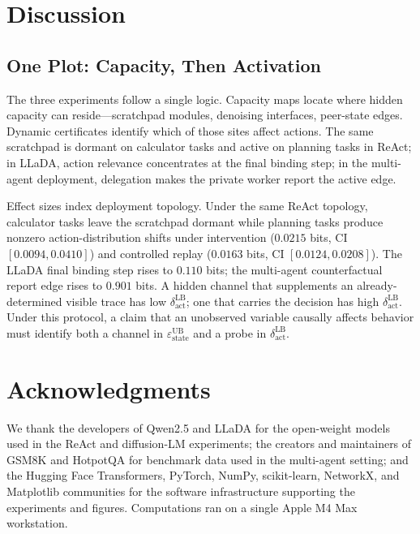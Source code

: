 \documentclass{article}
\begin{document}
  \section{Discussion}
  \label{sec:discussion}

  \subsection{One Plot: Capacity, Then Activation}

  The three experiments follow a single logic. Capacity maps locate where hidden
  capacity can reside---scratchpad modules, denoising interfaces, peer-state
  edges. Dynamic certificates identify which of those sites affect actions. The
  same scratchpad is dormant on calculator tasks and active on
  planning tasks in ReAct; in LLaDA, action relevance concentrates at the final
  binding step; in the multi-agent deployment, delegation makes the private
  worker report the active edge.

  Effect sizes index deployment topology. Under the same ReAct topology,
  calculator tasks leave the scratchpad dormant while planning tasks produce
  nonzero action-distribution shifts under intervention ($0.0215$ bits, CI
  $[0.0094,0.0410]$) and controlled replay ($0.0163$ bits, CI
  $[0.0124,0.0208]$). The LLaDA final binding step rises to $0.110$ bits; the
  multi-agent counterfactual report edge rises to $0.901$ bits. A hidden channel
   that supplements an already-determined visible trace has low
  $\delta_\text{act}^\text{LB}$; one that carries the decision has high
  $\delta_\text{act}^\text{LB}$. Under this protocol, a claim that an unobserved
   variable causally affects behavior must identify both a channel in
  $\varepsilon_\text{state}^\text{UB}$ and a probe in
  $\delta_\text{act}^\text{LB}$.

  \section*{Acknowledgments}

  We thank the developers of Qwen2.5 and LLaDA for the open-weight models used
  in the ReAct and diffusion-LM experiments; the creators and maintainers of
  GSM8K and HotpotQA for benchmark data used in the multi-agent setting; and the
   Hugging Face Transformers, PyTorch, NumPy, scikit-learn, NetworkX, and
  Matplotlib communities for the software infrastructure supporting the
  experiments and figures.
  Computations ran on a single Apple M4 Max workstation.
\end{document}
